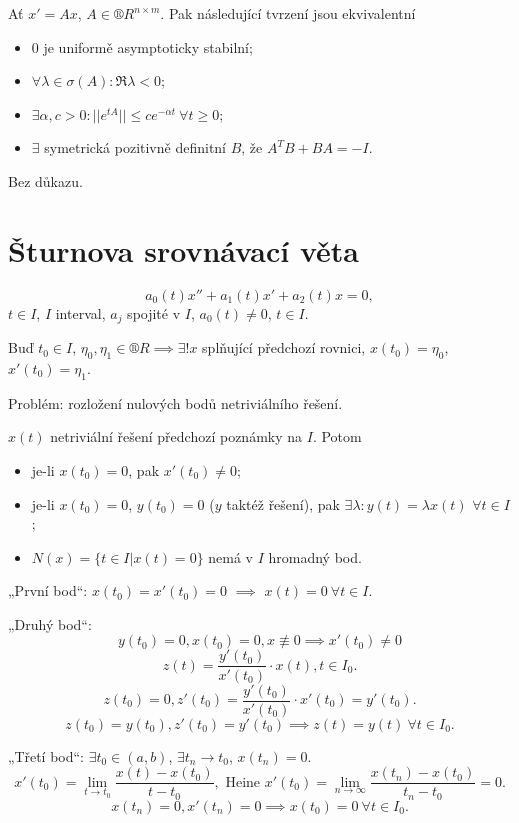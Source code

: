 \documentclass[12pt]{article}					%
\begin{document}
\begin{veta}
	Ať $x' = Ax$, $A \in ®R^{n \times m}$. Pak následující tvrzení jsou ekvivalentní

	\begin{itemize}
		\item 0 je uniformě asymptoticky stabilní;
		\item $\forall \lambda \in \sigma(A): \Re \lambda < 0$;
		\item $\exists \alpha, c > 0: ||e^{tA}|| ≤ c e^{-\alpha t}\ \forall t ≥ 0$;
		\item $\exists$ symetrická pozitivně definitní $B$, že $A^TB + BA = -I$.
	\end{itemize}

	\begin{dukazin}
		Bez důkazu.
	\end{dukazin}
\end{veta}


\section{Šturnova srovnávací věta}
\begin{poznamka}
	$$ a_0(t)x'' + a_1(t)x' + a_2(t)x = 0, $$
	$t \in I$, $I$ interval, $a_j$ spojité v $I$, $a_0(t) ≠ 0$, $t \in I$.

	Buď $t_0 \in I$, $\eta_0, \eta_1 \in ®R \implies \exists! x$ splňující předchozí rovnici, $x(t_0) = \eta_0$, $x'(t_0) = \eta_1$.

	Problém: rozložení nulových bodů netriviálního řešení.
\end{poznamka}

\begin{lemma}
	$x(t)$ netriviální řešení předchozí poznámky na $I$. Potom

	\begin{itemize}
		\item je-li $x(t_0) = 0$, pak $x'(t_0) ≠ 0$;
		\item je-li $x(t_0) = 0$, $y(t_0) = 0$ ($y$ taktéž řešení), pak $\exists \lambda: y(t) = \lambda x(t)$ $\forall t \in I$;
		\item $N(x) = \{t \in I | x(t) = 0\}$ nemá v $I$ hromadný bod.
	\end{itemize}

	\begin{dukazin}
		„První bod“: $x(t_0) = x'(t_0) = 0$ $\implies$ $x(t) = 0\ \forall t \in I$.
		
		„Druhý bod“:
		$$ y(t_0) = 0, x(t_0) = 0, x \not\equiv 0 \implies x'(t_0) ≠ 0 $$
		$$ z(t) = \frac{y'(t_0)}{x'(t_0)}·x(t), t \in I_0. $$
		$$ z(t_0) = 0, z'(t_0) = \frac{y'(t_0)}{x'(t_0)}·x'(t_0) = y'(t_0). $$
		$$ z(t_0) = y(t_0), z'(t_0) = y'(t_0) \implies z(t) = y(t)\ \forall t \in I_0. $$

		„Třetí bod“: $\exists t_0 \in (a, b)$, $\exists t_n \rightarrow t_0$, $x(t_n) = 0$.
		$$ x'(t_0) = \lim_{t \rightarrow t_0} \frac{x(t) - x(t_0)}{t - t_0}, \text{ Heine } x'(t_0) = \lim_{n \rightarrow ∞} \frac{x(t_n) - x(t_0)}{t_n - t_0} = 0. $$
		$$ x(t_n) = 0, x'(t_n) = 0 \implies x(t_0) = 0\ \forall t \in I_0. $$
	\end{dukazin}
\end{lemma}
\end{document}
